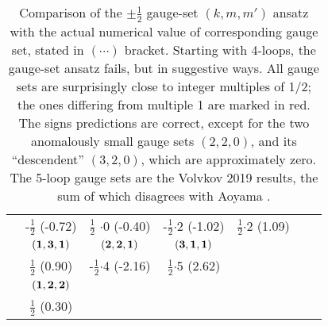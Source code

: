 \begin{table}
{\begin{tabular}{r@{~~~~}ccccc@{~~~~}l}
                 & -$\frac{1}{2}$ (-0.72)   & $\frac{1}{2}$  {\color{red} $\cdot 0$ (-0.40)}
                                        & -$\frac{1}{2}${\color{red}$\cdot$2} (-1.02)
                                             &  $\frac{1}{2}${\color{red}$\cdot$2} (1.09)
 \\%
\raisebox{1.5ex}{10}
 & $\bf (1,3,1)$  & $\bf (2,2,1)$ & $\bf (3,1,1)$ &&&
        \raisebox{1.5ex}{$\frac{3}{2} {\color{red} \cdot 4}\,(6.78)$}\\
 &  $\frac{1}{2}$ (0.90)    & -$\frac{1}{2}${\color{red}$\cdot$4} (-2.16)
                                  & $\frac{1}{2}${\color{red}$\cdot$5} (2.62)
  \\[1ex]
 & $\bf (1,2,2)$ \\
 & $\frac{1}{2}$ (0.30)
  \\[1ex]
\bottomrule
\end{tabular}
} %
\caption{\label{tabGaugeSets}
Comparison of the $\pm\frac{1}{2}$ gauge-set $(k,m,m')$ ansatz 
with the actual numerical value of corresponding gauge set, stated in $(\cdots)$
bracket.
Starting with 4-loops, the gauge-set ansatz  fails, but in
suggestive ways.
All gauge sets are surprisingly close to integer multiples of 1/2;
the ones differing from multiple 1 are marked in red.
The signs predictions are correct, except for the two anomalously small gauge sets
$(2,2,0)$, and its ``descendent'' $(3,2,0)$, which are approximately zero.
The 5-loop gauge sets are the Volvkov 2019 results,
the sum of which disagrees with Aoyama \etal{}.
}
\end{table}
